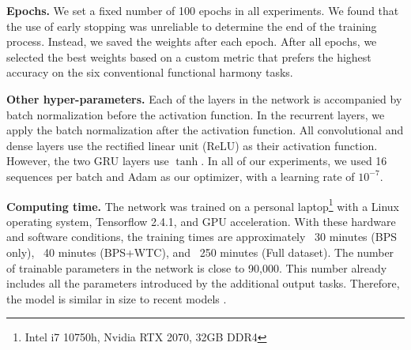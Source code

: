 
\textbf{Epochs.}
We set a fixed number of 100 epochs in all experiments.
We found that the use of early stopping was unreliable to determine the end of the training process.
Instead, we saved the weights after each epoch.
After all epochs, we selected the best weights based on a custom metric that prefers the highest accuracy on the six conventional functional harmony tasks.

\textbf{Other hyper-parameters.}
Each of the layers in the network is accompanied by batch normalization before the activation function. In the recurrent layers, we apply the batch normalization after the activation function. All convolutional and dense layers use the rectified linear unit (ReLU) as their activation function. However, the two GRU layers use $\tanh$. In all of our experiments, we used 16 sequences per batch and Adam \parencite{kingma2014adam} as our optimizer, with a learning rate of $10^{-7}$.



\textbf{Computing time.} The network was trained on a personal laptop\footnote{Intel i7 10750h, Nvidia RTX 2070, 32GB DDR4} with a Linux operating system, Tensorflow 2.4.1, and GPU acceleration.
With these hardware and software conditions, the training times are approximately ~30 minutes (BPS only), ~40 minutes (BPS+WTC), and ~250 minutes (Full dataset).
The number of trainable parameters in the network is close to 90,000. This number already includes all the parameters introduced by the additional output tasks. Therefore, the model is similar in size to recent models \parencite{micchi2020not, chen2021attend}.
